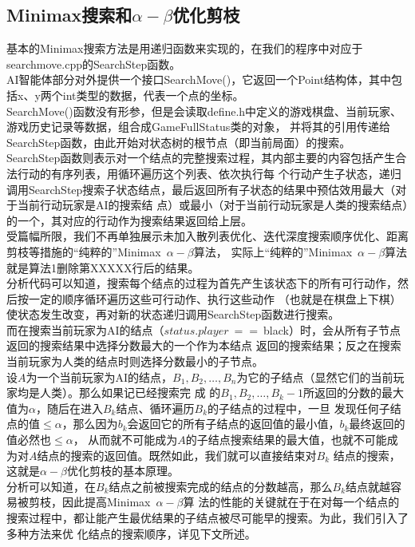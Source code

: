 \documentclass{acm_proc_article-sp}
\begin{document}
\subsection{\textbf{Minimax搜索和$\alpha-\beta$优化剪枝}}
基本的Minimax搜索方法是用递归函数来实现的，在我们的程序中对应于searchmove.cpp的SearchStep函数。\\
AI智能体部分对外提供一个接口SearchMove()，它返回一个Point结构体，其中包括x、y两个int类型的数据，代表一个点的坐标。\\
SearchMove()函数没有形参，但是会读取define.h中定义的游戏棋盘、当前玩家、游戏历史记录等数据，组合成GameFullStatus类的对象，
并将其的引用传递给SearchStep函数，由此开始对状态树的根节点（即当前局面）的搜索。\\
SearchStep函数则表示对一个结点的完整搜索过程，其内部主要的内容包括产生合法行动的有序列表，用循环遍历这个列表、依次执行每
个行动产生子状态，递归调用SearchStep搜索子状态结点，最后返回所有子状态的结果中预估效用最大（对于当前行动玩家是AI的搜索结
点）或最小（对于当前行动玩家是人类的搜索结点）的一个，其对应的行动作为搜索结果返回给上层。\\
受篇幅所限，我们不再单独展示未加入散列表优化、迭代深度搜索顺序优化、距离剪枝等措施的“纯粹的”Minimax\ $\alpha-\beta$算法，
实际上“纯粹的”Minimax\ $\alpha-\beta$算法就是算法1删除第XXXXX行后的结果。\\
分析代码可以知道，搜索每个结点的过程为首先产生该状态下的所有可行动作，然后按一定的顺序循环遍历这些可行动作、执行这些动作
（也就是在棋盘上下棋）使状态发生改变，再对新的状态递归调用SearchStep函数进行搜索。\\
而在搜索当前玩家为AI的结点（$status.player\ ==\ $black）时，会从所有子节点返回的搜索结果中选择分数最大的一个作为本结点
返回的搜索结果；反之在搜索当前玩家为人类的结点时则选择分数最小的子节点。\\
设$A$为一个当前玩家为AI的结点，$B_1, B_2, \dots , B_n$为它的子结点（显然它们的当前玩家均是人类）。那么如果记已经搜索完
成 的$B_1, B_2, \dots , B_k-1$所返回的分数的最大值为$\alpha$，随后在进入$B_k$结点、循环遍历$B_k$的子结点的过程中，一旦
发现任何子结点的值$\leq \alpha$，那么因为$b_k$会返回它的所有子结点的返回值的最小值，$b_k$最终返回的值必然也$\leq \alpha$，
从而就不可能成为$A$的子结点搜索结果的最大值，也就不可能成为对$A$结点的搜索的返回值。既然如此，我们就可以直接结束对$B_k$
结点的搜索，这就是$\alpha-\beta$优化剪枝的基本原理。\\
分析可以知道，在$B_k$结点之前被搜索完成的结点的分数越高，那么$B_k$结点就越容易被剪枝，因此提高Minimax\ $\alpha-\beta$算
法的性能的关键就在于在对每一个结点的搜索过程中，都让能产生最优结果的子结点被尽可能早的搜索。为此，我们引入了多种方法来优
化结点的搜索顺序，详见下文所述。
\end{document}
